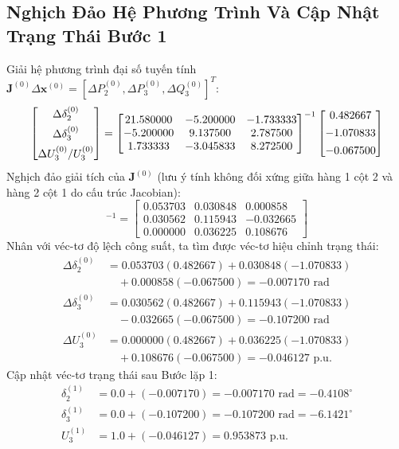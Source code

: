 \documentclass[12pt,a4paper,oneside]{report}
\begin{document}
\subsection{Nghịch Đảo Hệ Phương Trình Và Cập Nhật Trạng Thái Bước 1}
Giải hệ phương trình đại số tuyến tính $\mathbf{J}^{(0)} \Delta \mathbf{x}^{(0)} = [\Delta P_2^{(0)}, \Delta P_3^{(0)}, \Delta Q_3^{(0)}]^T$:
\begin{equation}
\resizebox{0.92\textwidth}{!}{$
\begin{bmatrix}
\Delta \delta_2^{(0)} \\[4pt]
\Delta \delta_3^{(0)} \\[4pt]
\Delta U_3^{(0)} / U_3^{(0)}
\end{bmatrix}
=
\begin{bmatrix}
21.580000 & -5.200000 & -1.733333 \\
-5.200000 & 9.137500 & 2.787500 \\
1.733333 & -3.045833 & 8.272500
\end{bmatrix}^{-1}
\begin{bmatrix}
0.482667 \\[4pt]
-1.070833 \\[4pt]
-0.067500
\end{bmatrix}
$}
\end{equation}
Nghịch đảo giải tích của $\mathbf{J}^{(0)}$ (lưu ý tính không đối xứng giữa hàng 1 cột 2 và hàng 2 cột 1 do cấu trúc Jacobian):
\begin{equation}
[\mathbf{J}^{(0)}]^{-1} =
\begin{bmatrix}
0.053703 & 0.030848 & 0.000858 \\
0.030562 & 0.115943 & -0.032665 \\
0.000000 & 0.036225 & 0.108676
\end{bmatrix}
\end{equation}
Nhân với véc-tơ độ lệch công suất, ta tìm được véc-tơ hiệu chỉnh trạng thái:
\begin{align}
\Delta \delta_2^{(0)} &= 0.053703(0.482667) + 0.030848(-1.070833) \nonumber \\
&\quad + 0.000858(-0.067500) = -0.007170\text{ rad} \\
\Delta \delta_3^{(0)} &= 0.030562(0.482667) + 0.115943(-1.070833) \nonumber \\
&\quad - 0.032665(-0.067500) = -0.107200\text{ rad} \\
\Delta U_3^{(0)} &= 0.000000(0.482667) + 0.036225(-1.070833) \nonumber \\
&\quad + 0.108676(-0.067500) = -0.046127\text{ p.u.}
\end{align}
Cập nhật véc-tơ trạng thái sau Bước lặp 1:
\begin{align}
\delta_2^{(1)} &= 0.0 + (-0.007170) = -0.007170\text{ rad} = -0.4108^\circ \\
\delta_3^{(1)} &= 0.0 + (-0.107200) = -0.107200\text{ rad} = -6.1421^\circ \\
U_3^{(1)} &= 1.0 + (-0.046127) = 0.953873\text{ p.u.}
\end{align}
\end{document}
